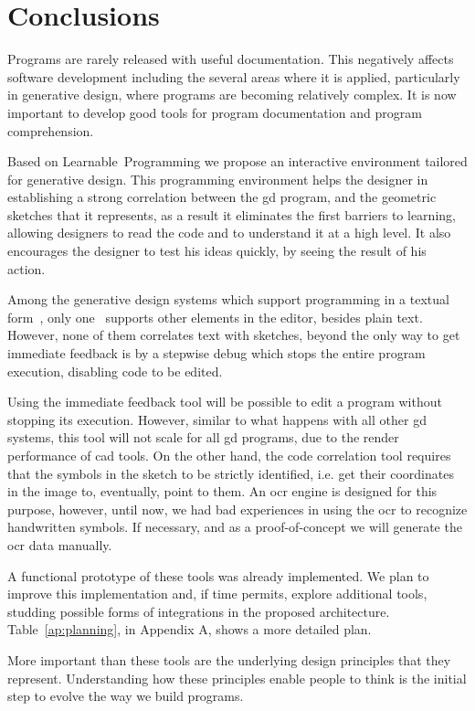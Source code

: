 
% 
% 

\section{Conclusions}
\label{sec:fin}

Programs are rarely released with useful documentation. This negatively affects software development including the several areas where it is applied, particularly in generative design, where programs are becoming relatively complex. It is now important to develop good tools for program documentation and program comprehension.

Based on Learnable~Programming we propose an interactive environment tailored for generative design. This programming environment helps the designer in establishing a strong correlation between the \ac{gd} program, and the geometric sketches that it represents, as a result it eliminates the first barriers to learning, allowing designers to read the code and to understand it at a high level. It also encourages the designer to test his ideas quickly, by seeing the result of his action.

Among the generative design systems which support programming in a textual form~\cite{aish2012designscript,lopes2011portable}, only one~\cite{lopes2011portable} supports other elements in the editor, besides plain text. However, none of them correlates text with sketches, beyond the only way to get immediate feedback is by a stepwise debug which stops the entire program execution, disabling code to be edited.

Using the immediate feedback tool will be possible to edit a program without stopping its execution. However, similar to what happens with all other \ac{gd} systems, this tool will not scale for all \ac{gd} programs, due to the render performance of \ac{cad} tools. On the other hand, the code correlation tool requires that the symbols in the sketch to be strictly identified, i.e. get their coordinates in the image to, eventually, point to them. An \ac{ocr} engine is designed for this purpose, however, until now, we had bad experiences in using the \ac{ocr} to recognize handwritten symbols. If necessary, and as a proof-of-concept we will generate the \ac{ocr} data manually.

A functional prototype of these tools was already implemented. We plan to improve this implementation and, if time permits, explore additional tools, studding possible forms of integrations in the proposed architecture. Table~\ref{ap:planning}, in Appendix A, shows a more detailed plan.

More important than these tools are the underlying design principles that they represent. Understanding how these principles enable people to think is the initial step to evolve the way we build programs.